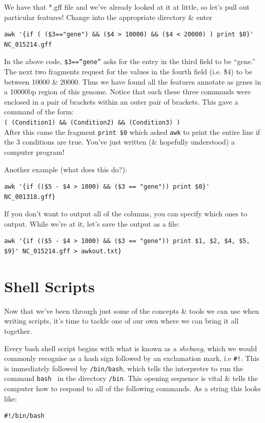 \documentclass[a4paper,12pt,twoside]{memoir}
\begin{document}
\begin{steps}
We have that *.gff file and we've already looked at it at little, so let's pull out particular features!
Change into the appropriate directory \& enter
\begin{lstlisting}
awk '{if ( ($3=="gene") && ($4 > 10000) && ($4 < 20000) ) print $0}' NC_015214.gff
\end{lstlisting}
\end{steps}
\begin{note}
In the above code, \texttt{\$3==''gene''} asks for the entry in the third field to be ``gene.''
The next two fragments request for the values in the fourth field (i.e. \$4) to be between 10000 \& 20000.
Thus we have found all the features annotate as genes in a 10000bp region of this genome.
Notice that each these three commands were enclosed in a pair of brackets within an outer pair of brackets.
This gave a command of the form: \\
\texttt{( (Condition1) \&\& (Condition2) \&\& (Condition3) )} \\
After this came the fragment \texttt{print \$0} which asked \texttt{awk} to print the entire line if the 3 conditions are true.
You've just written (\& hopefully understood) a computer program!
\end{note}

\begin{steps}
Another example (what does this do?): \\
\begin{lstlisting}
awk '{if (($5 - $4 > 1000) && ($3 == "gene")) print $0}' NC_001318.gff} 
\end{lstlisting}
If you don't want to output all of the columns, you can specify which ones to output.  
While we're at it, let's save the output as a file: \\
\begin{lstlisting}
awk '{if (($5 - $4 > 1000) && ($3 == "gene")) print $1, $2, $4, $5, $9}' NC_015214.gff > awkout.txt}
\end{lstlisting}
\end{steps}

\section{Shell Scripts}
Now that we've been through just some of the concepts \& tools we can use when writing scripts, it's time to tackle one of our own where we can bring it all together.

\begin{information}
Every bash shell script begins with what is known as a \textit{shebang}, which we would commonly recognise as a hash sign followed by an exclamation mark, i.e \texttt{\#!}.
This is immediately followed by \texttt{/bin/bash}, which tells the interpreter to run the command \texttt{bash } in the directory \texttt{/bin}.
This opening sequence is vital \& tells the computer how to respond to all of the following commands.
As a string this looks like:\\
\begin{lstlisting}
#!/bin/bash
\end{lstlisting}
\end{information}
\end{document}
